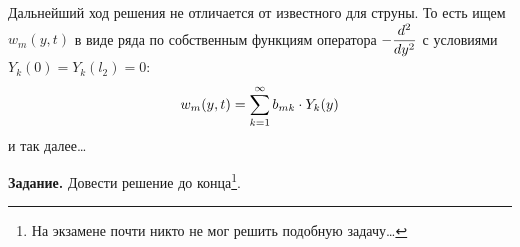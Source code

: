 Дальнейший ход решения не отличается от известного для струны. То есть ищем $w_m(y,t)$ в виде ряда по собственным функциям оператора $\displaystyle-\frac{d^2}{dy^2}$ с условиями $Y_k(0)=Y_k(l_2)=0$:
\begin{equation*}
	\hfill w_m(y,t)=\sum\limits_{k=1}^{\infty}b_{mk}\cdot Y_k(y)\hfill
\end{equation*}
и так далее\dots
\vspace{0.2cm}

\noindent\textbf{Задание.} Довести решение до конца\footnote{На экзамене почти никто не мог решить подобную задачу\dots}.